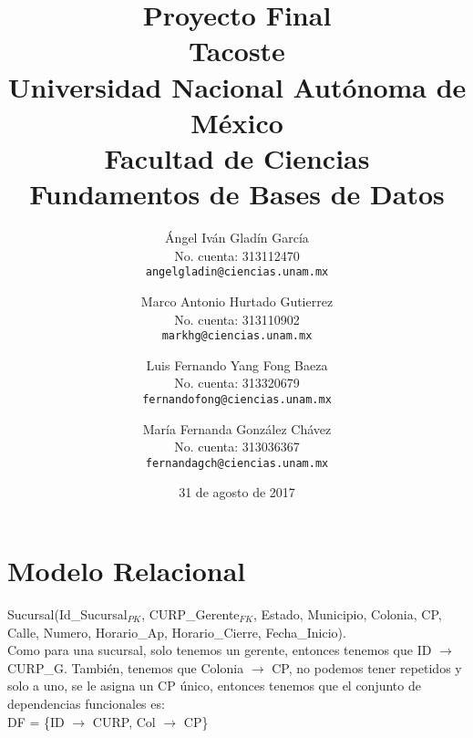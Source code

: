 \documentclass[11pt,letterpaper]{article}
\begin{document}
\title{\vspace{-1.5cm}
    Proyecto Final\\
    Tacoste\\
    \large Universidad Nacional Autónoma de México\\
    Facultad de Ciencias\\
    Fundamentos de Bases de Datos\\}
\author{
	Ángel Iván Gladín García\\
    No. cuenta: 313112470\\
    \texttt{angelgladin@ciencias.unam.mx}
    \and
    Marco Antonio Hurtado Gutierrez\\
    No. cuenta: 313110902\\
    \texttt{markhg@ciencias.unam.mx}
    \and
    Luis Fernando Yang Fong Baeza\\
    No. cuenta: 313320679\\
    \texttt{fernandofong@ciencias.unam.mx}
    \and
    María Fernanda González Chávez\\
    No. cuenta: 313036367\\
    \texttt{fernandagch@ciencias.unam.mx}
}
\date{31 de agosto de 2017}
\maketitle



\section*{Modelo Relacional}%

Sucursal(Id\_Sucursal\(_{PK}\), CURP\_Gerente\(_{FK}\), Estado, Municipio, Colonia, CP, Calle, Numero, Horario\_Ap, Horario\_Cierre, Fecha\_Inicio).\\

Como para una sucursal, solo tenemos un gerente, entonces tenemos que
ID \(\rightarrow\) CURP\_G. También, tenemos que Colonia \(\rightarrow\) CP, no podemos tener repetidos y solo a uno, se le asigna un CP único, entonces tenemos que el conjunto de dependencias funcionales es:\\

DF = \{ID \(\rightarrow\) CURP, Col \(\rightarrow\) CP\}\\
\end{document}
